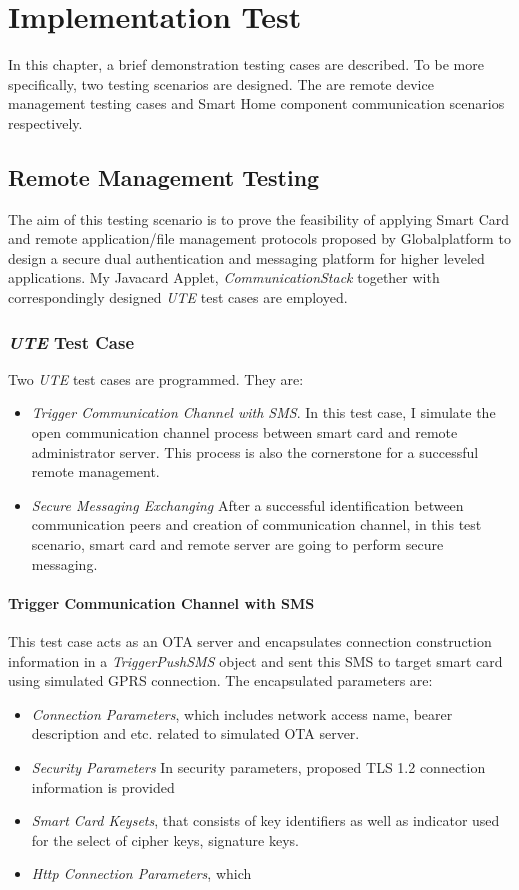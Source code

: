 \chapter{Implementation Test}
In this chapter, a brief demonstration testing cases are described. To be more specifically, two testing scenarios are designed. The are remote device management testing cases and Smart Home component communication scenarios respectively.

\section{Remote Management Testing}
The aim of this testing scenario is to prove the feasibility of applying Smart Card and remote application/file management protocols proposed by Globalplatform to design a secure dual authentication and messaging platform for higher leveled applications. My Javacard Applet, \emph{CommunicationStack} together with correspondingly designed \emph{UTE} test cases are employed.

\subsection{\emph{UTE} Test Case}
Two \emph{UTE} test cases are programmed. They are:
\begin{itemize}
\item \emph{Trigger Communication Channel with SMS}. In this test case, I simulate the open communication channel process between smart card and remote administrator server. This process is also the cornerstone for a successful remote management.
\item \emph{Secure Messaging Exchanging} After a successful identification between communication peers and creation of communication channel, in this test scenario, smart card and remote server are going to perform secure messaging. 
\end{itemize}

\subsubsection{Trigger Communication Channel with SMS}
This test case acts as an OTA server and encapsulates connection construction information in a \emph{TriggerPushSMS} object and sent this SMS to target smart card using simulated GPRS connection. The encapsulated parameters are:
\begin{itemize}
\item \emph{Connection Parameters}, which includes network access name, bearer description and etc. related to simulated OTA server.
\item \emph{Security Parameters} In security parameters, proposed TLS 1.2 connection information is provided
\item \emph{Smart Card Keysets}, that consists of key identifiers as well as indicator used for the select of cipher keys, signature keys.
\item \emph{Http Connection Parameters}, which 
\end{itemize}



